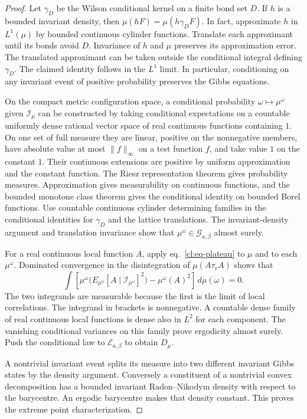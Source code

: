 \documentclass[11pt,letterpaper,reqno]{amsart}
\numberwithin{equation}{section}
\renewcommand{\eqref}[1]{\textup{eq.~\ref{#1}}}
\theoremstyle{definition}
\theoremstyle{remark}
\begin{document}
\begin{proof}
Let \(\gamma_D\) be the Wilson conditional kernel on a finite
bond set \(D\). If \(h\) is a bounded invariant density, then
\(\mu(hF)=\mu(h\gamma_DF)\). In fact, approximate \(h\) in
\(L^1(\mu)\) by bounded continuous cylinder functions. Translate
each approximant until its bonds avoid \(D\).
Invariance of \(h\) and \(\mu\) preserves its approximation
error. The translated approximant can be taken outside the
conditional integral defining \(\gamma_D\). The claimed
identity follows in the \(L^1\) limit. In particular,
conditioning on any invariant event of positive probability
preserves the Gibbs equations.

On the compact metric configuration space, a conditional
probability \(\omega\mapsto\mu^\omega\) given
\(\mathcal I_\mu\) can be constructed by taking conditional
expectations on a countable uniformly dense rational vector
space of real continuous functions containing \(1\). On one
set of full measure they are linear, positive on the
nonnegative members, have absolute value at most \(\|f\|_\infty\)
on a test function \(f\), and take value \(1\) on the constant \(1\). Their continuous
extensions are positive by uniform approximation and the
constant function. The Riesz representation theorem gives
probability measures. Approximation gives measurability on
continuous functions, and the bounded monotone class theorem
gives the conditional identity on bounded Borel functions.
Use countable continuous cylinder determining families in
the conditional identities for \(\gamma_D\) and the lattice
translations. The invariant-density argument and translation
invariance show that \(\mu^\omega\in\mathcal G_{a,\beta}\)
almost surely.

For a real continuous local function \(A\), apply
\eqref{cl:eq-plateau} to \(\mu\) and to each \(\mu^\omega\).
Dominated convergence in the disintegration of
\(\mu(A\tau_v A)\) shows that
\[
 \int\!\left[
   \mu^\omega\bigl(E_{\mu^\omega}
            [A\mid\mathcal I_{\mu^\omega}]^2\bigr)
             -\mu^\omega(A)^2\right]\,d\mu(\omega)=0 .
\]
The two integrands are measurable because the first is the
limit of local correlations. The integrand in brackets is
nonnegative. A countable dense family of real continuous
local functions is dense also in \(L^2\) for each component.
The vanishing conditional variances on this family prove
ergodicity almost surely. Push the conditional law to
\(\mathcal E_{a,\beta}\) to obtain \(D_\mu\).

A nontrivial invariant event splits its measure into two
different invariant Gibbs states by the density argument.
Conversely a constituent of a nontrivial convex decomposition
has a bounded invariant Radon--Nikodym density with respect
to the barycentre. An ergodic barycentre makes that density
constant. This proves the extreme point characterization.


\end{proof}
\end{document}
